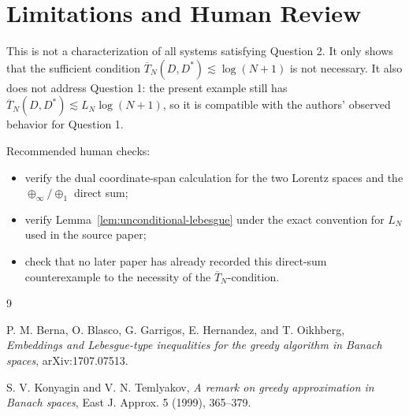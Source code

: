 \documentclass[11pt]{article}
\newcommand{\OT}{\overline T}
\begin{document}
\section{Limitations and Human Review}

This is not a characterization of all systems satisfying Question 2.  It only
shows that the sufficient condition \(\OT_N(D,D^*)\lesssim\log(N+1)\) is not
necessary.  It also does not address Question 1: the present example still has
\(\OT_N(D,D^*)\lesssim L_N\log(N+1)\), so it is compatible with the authors'
observed behavior for Question 1.

Recommended human checks:
\begin{itemize}
  \item verify the dual coordinate-span calculation for the two Lorentz
  spaces and the \(\oplus_\infty/\oplus_1\) direct sum;
  \item verify Lemma~\ref{lem:unconditional-lebesgue} under the exact
  convention for \(L_N\) used in the source paper;
  \item check that no later paper has already recorded this direct-sum
  counterexample to the necessity of the \(\OT_N\)-condition.
\end{itemize}

\begin{thebibliography}{9}

P. M. Berna, O. Blasco, G. Garrigos, E. Hernandez, and T. Oikhberg,
\emph{Embeddings and Lebesgue-type inequalities for the greedy algorithm in
Banach spaces}, arXiv:1707.07513.

S. V. Konyagin and V. N. Temlyakov,
\emph{A remark on greedy approximation in Banach spaces},
East J. Approx. 5 (1999), 365--379.

\end{thebibliography}
\end{document}
